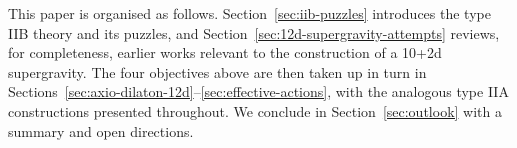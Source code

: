 This paper is organised as follows. Section~\ref{sec:iib-puzzles} introduces the type IIB theory and its puzzles, and Section~\ref{sec:12d-supergravity-attempts} reviews, for completeness, earlier works relevant to the construction of a 10+2d supergravity. 
The four objectives above are then taken up in turn in Sections~\ref{sec:axio-dilaton-12d}--\ref{sec:effective-actions}, with the analogous type IIA constructions presented throughout. We conclude in Section~\ref{sec:outlook} with a summary and open directions.